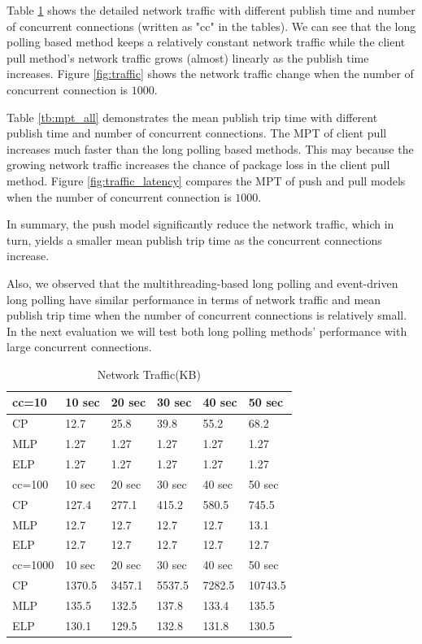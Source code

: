 Table \ref{tb:traffic} shows the detailed network traffic with different 
publish time and number of concurrent connections (written as "cc" 
in the tables).  We can see that the long polling based method keeps 
a relatively constant network traffic while the client pull method's 
network traffic grows (almost) linearly as the publish time increases.
Figure \ref{fig:traffic} shows the network traffic change when the number 
of concurrent connection is $1000$.

Table \ref{tb:mpt_all} demonstrates the mean publish trip time with 
different publish time and number of concurrent connections. The MPT of
client pull increases much faster than the long polling based methods.
This may because the growing network traffic increases the chance
of package loss in the client pull method. 
Figure \ref{fig:traffic_latency} compares the MPT of push and pull models when 
the number of concurrent connection is $1000$.

In summary, the push model significantly reduce the network traffic, which in
turn, yields a smaller mean publish trip time as the concurrent connections 
increase. 

Also, we observed that the multithreading-based long polling and event-driven long 
polling have similar performance in terms of network traffic and mean publish
trip time when the number of concurrent connections is relatively small. In the 
next evaluation we will test both long polling methods' performance with large 
concurrent connections.

\begin{table}
\centering \caption{\label{tb:traffic} Network Traffic(KB)}
\begin{tabular}{|l|l|l|l|l|l|}
    \hline cc=10& 10 sec & 20 sec & 30 sec & 40 sec & 50 sec \\
    \hline CP & 12.7 & 25.8 & 39.8 & 55.2 & 68.2 \\
    \hline MLP & 1.27 & 1.27 & 1.27 & 1.27 & 1.27 \\
    \hline ELP & 1.27 & 1.27 & 1.27 & 1.27 & 1.27 \\
    \hline
    \hline cc=100& 10 sec & 20 sec & 30 sec & 40 sec & 50 sec \\
    \hline CP & 127.4 & 277.1 & 415.2 & 580.5 & 745.5 \\
    \hline MLP & 12.7 & 12.7 & 12.7 & 12.7 & 13.1 \\
    \hline ELP & 12.7 & 12.7 & 12.7 & 12.7 & 12.7 \\
    \hline
    \hline cc=1000 & 10 sec & 20 sec & 30 sec & 40 sec & 50 sec \\
    \hline CP & 1370.5 & 3457.1 & 5537.5 & 7282.5 & 10743.5 \\
    \hline MLP & 135.5 & 132.5 & 137.8 & 133.4 & 135.5 \\
    \hline ELP & 130.1 & 129.5 & 132.8 & 131.8 & 130.5 \\
    \hline
\end{tabular}
\end{table}

